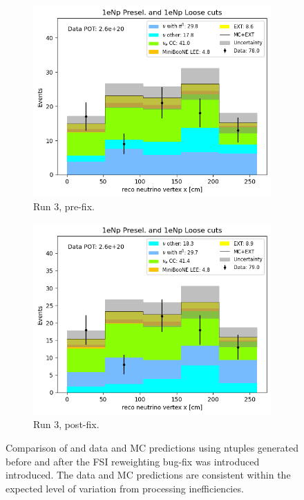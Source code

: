 \begin{figure}[H]
\begin{subfigure}{0.5\linewidth}
        \includegraphics[width=\linewidth]{technote/SystematicsSensitivity/Figures/Run3_Vertex_X_Alex.png}
        \caption{Run 3, pre-fix.}
    \end{subfigure}%
    \begin{subfigure}{0.5\linewidth}
        \includegraphics[width=\linewidth]{technote/SystematicsSensitivity/Figures/Run3_Vertex_X_Alex_BugFix.png}
        \caption{Run 3, post-fix.}
    \end{subfigure}
    \caption{Comparison of and data and MC predictions using ntuples generated before and after the FSI reweighting bug-fix was introduced introduced. The data and MC predictions are consistent within the expected level of variation from processing inefficiencies.}
    \label{fig:FSIBugFixValidation}
\end{figure}

